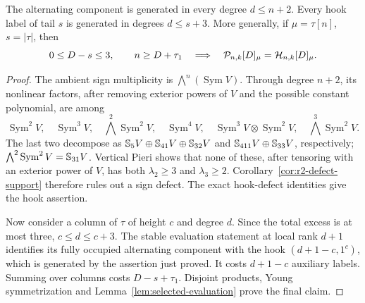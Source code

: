 \begin{lemma}
\label{lem:four-tail-degrees}
The alternating component is generated in every degree $d\le n+2$.
Every hook label of tail $s$ is generated in degrees $d\le s+3$.
More generally, if $\mu=\tau[n]$, $s=|\tau|$, then
\[
 0\le D-s\le3,\qquad n\ge D+\tau_1
 \quad\Longrightarrow\quad
 \mathcal P_{n,k}[D]_\mu=\mathcal H_{n,k}[D]_\mu .
\]
\end{lemma}
\begin{proof}
The ambient sign multiplicity is
$\bigwedge^n(\operatorname{Sym}V)$.
Through degree $n+2$, its nonlinear factors, after removing exterior
powers of $V$ and the possible constant polynomial, are among
\[
 \operatorname{Sym}^2V,\quad \operatorname{Sym}^3V,\quad
 \bigwedge^2\operatorname{Sym}^2V,\quad
 \operatorname{Sym}^4V,\quad
 \operatorname{Sym}^3V\otimes\operatorname{Sym}^2V,\quad
 \bigwedge^3\operatorname{Sym}^2V .
\]
The last two decompose as
$\mathbb S_5V\oplus \mathbb S_{41}V\oplus \mathbb S_{32}V$ and
$\mathbb S_{411}V\oplus \mathbb S_{33}V$, respectively;
$\bigwedge^2\operatorname{Sym}^2V=\mathbb S_{31}V$.
Vertical Pieri shows that none of these, after tensoring with an
exterior power of $V$, has both $\lambda_2\ge3$ and $\lambda_3\ge2$.
Corollary~\ref{cor:r2-defect-support} therefore rules out a sign
defect. The exact hook-defect identities give the hook assertion.

Now consider a column of $\tau$ of height $c$ and degree $d$.
Since the total excess is at most three, $c\le d\le c+3$.
The stable evaluation statement at local rank $d+1$ identifies
its fully occupied alternating component with the hook
$(d+1-c,1^c)$, which is generated by the assertion just proved.
It costs $d+1-c$ auxiliary labels. Summing over columns costs
$D-s+\tau_1$. Disjoint products, Young symmetrization and Lemma~\ref{lem:selected-evaluation} prove the final claim.
\end{proof}

